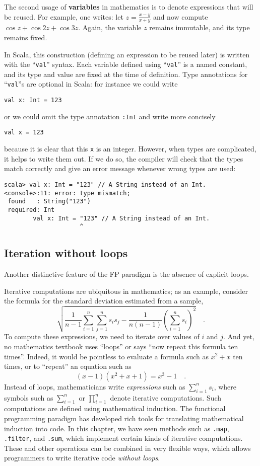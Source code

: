 The second usage of \textbf{variables} in mathematics
is to denote expressions that will be reused. For example, one writes:
let $z=\frac{x-y}{x+y}$ and now compute $\cos z+\cos2z+\cos3z$.
Again, the variable $z$ remains immutable, and its type remains fixed.

In Scala, this construction (defining an expression to be reused later)
is written with the ``\lstinline!val!'' syntax. Each variable defined
using ``\lstinline!val!'' is a named constant, and its type and
value are fixed at the time of definition. Type annotations for ``\lstinline!val!''s
are optional in Scala: for instance we could write 
\begin{lstlisting}
val x: Int = 123
\end{lstlisting}
or we could omit the type annotation \lstinline!:Int! and write more
concisely
\begin{lstlisting}
val x = 123
\end{lstlisting}
because it is clear that this \texttt{}\lstinline!x! is an integer.
However, when types are complicated, it helps to write them out. If
we do so, the compiler will check that the types match correctly and
give an error message whenever wrong types are used:
\begin{lstlisting}
scala> val x: Int = "123" // A String instead of an Int.
<console>:11: error: type mismatch;
 found   : String("123")
 required: Int
        val x: Int = "123" // A String instead of an Int.                     
                     ^ 
\end{lstlisting}


\subsection{Iteration without loops}

Another distinctive feature of the FP paradigm is the absence of explicit
loops.

Iterative computations are ubiquitous in mathematics; as an example,
consider the formula for the standard deviation estimated from a sample,
\[
\sqrt{\frac{1}{n-1}\sum_{i=1}^{n}\sum_{j=1}^{n}s_{i}s_{j}-\frac{1}{n\left(n-1\right)}\left(\sum_{i=1}^{n}s_{i}\right)^{2}}\quad.
\]
To compute these expressions, we need to iterate over values of $i$
and $j$. And yet, no mathematics textbook uses ``loops'' or says
``now repeat this formula ten times''. Indeed, it would be pointless
to evaluate a formula such as $x^{2}+x$ ten times, or to ``repeat''
an equation such as
\[
\left(x-1\right)(x^{2}+x+1)=x^{3}-1\quad.
\]
Instead of loops, mathematicians write \emph{expressions} such as
$\sum_{i=1}^{n}s_{i}$, where symbols such as $\sum_{i=1}^{n}$ or
$\prod_{i=1}^{n}$ denote iterative computations. Such computations
are defined using mathematical induction.
The functional programming paradigm has developed rich tools for translating
mathematical induction into code. In this chapter, we have seen methods
such as \lstinline!.map!, \lstinline!.filter!, and \lstinline!.sum!,
which implement certain kinds of iterative computations. These and
other operations can be combined in very flexible ways, which allows
programmers to write iterative code \emph{without loops}.

